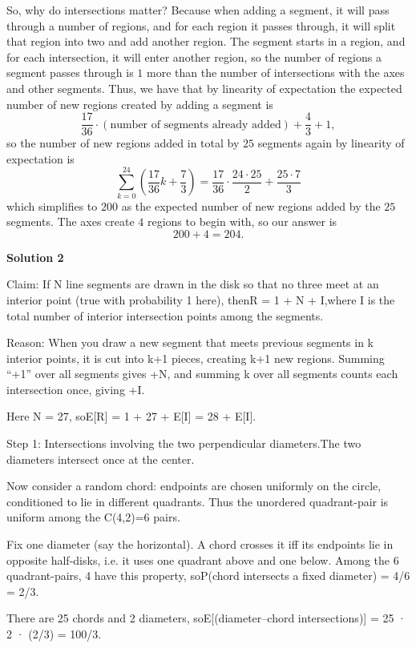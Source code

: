 \begin{enumerate}
 So, why do intersections matter? Because when adding a segment, it will pass through a number of regions, and for each region it passes through, it will split that region into two and add another region. The segment starts in a region, and for each intersection, it will enter another region, so the number of regions a segment passes through is $1$ more than the number of intersections with the axes and other segments. Thus, we have that by linearity of expectation the expected number of new regions created by adding a segment is
 \[\dfrac{17}{36}\cdot(\text{number of segments already added})+\dfrac{4}{3}+1,\]so the number of new regions added in total by $25$ segments again by linearity of expectation is
 \[\sum_{k=0}^{24}\left(\dfrac{17}{36}k+\dfrac{7}{3}\right)=\dfrac{17}{36}\cdot \dfrac{24\cdot 25}{2}+\dfrac{25\cdot 7}{3}\]which simplifies to $200$ as the expected number of new regions added by the $25$ segments. The axes create $4$ regions to begin with, so our answer is
 \[200+4=\boxed{204}.\]




\textbf{Solution 2}

Claim: If N line segments are drawn in the disk so that no three meet at an interior point (true with probability 1 here), thenR = 1 + N + I,where I is the total number of interior intersection points among the segments.

 Reason: When you draw a new segment that meets previous segments in k interior points, it is cut into k+1 pieces, creating k+1 new regions. Summing “+1” over all segments gives +N, and summing k over all segments counts each intersection once, giving +I.

 Here N = 27, soE[R] = 1 + 27 + E[I] = 28 + E[I].

 Step 1: Intersections involving the two perpendicular diameters.The two diameters intersect once at the center.

 Now consider a random chord: endpoints are chosen uniformly on the circle, conditioned to lie in different quadrants. Thus the unordered quadrant-pair is uniform among the C(4,2)=6 pairs.

 Fix one diameter (say the horizontal). A chord crosses it iff its endpoints lie in opposite half-disks, i.e. it uses one quadrant above and one below. Among the 6 quadrant-pairs, 4 have this property, soP(chord intersects a fixed diameter) = 4/6 = 2/3.

 There are 25 chords and 2 diameters, soE[(diameter–chord intersections)] = 25 · 2 · (2/3) = 100/3.


\end{enumerate}
